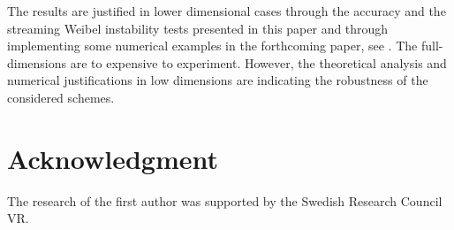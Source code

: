 \documentclass[reqno,a4paper]{amsart}
\theoremstyle{remark}
\numberwithin{equation}{section}
\begin{document}
The results are justified in lower dimensional cases through the accuracy
and the streaming Weibel instability tests presented in this paper
and through implementing some numerical examples in the forthcoming paper,
see \cite{Malmberg_Standar}. 
The full-dimensions are to expensive to experiment. 
However, the theoretical analysis and numerical justifications in 
low dimensions are indicating the robustness of the considered schemes. 





\section*{Acknowledgment} 

The research of the first author was supported by the 
Swedish Research Council VR. 











\def\listing#1#2#3{{\sc #1}:\ {\it #2},\ #3.}
\end{document}
